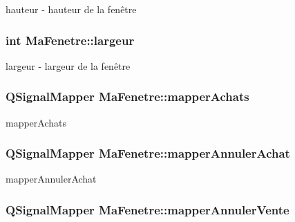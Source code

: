 hauteur -\/ hauteur de la fenêtre 

\hypertarget{class_ma_fenetre_abe37db89fd8895cc34ccc0f5cda67aaf}{
\subsubsection[{largeur}]{\setlength{\rightskip}{0pt plus 5cm}int Ma\-Fenetre\-::largeur\hspace{0.3cm}{\ttfamily [protected]}}}\label{class_ma_fenetre_abe37db89fd8895cc34ccc0f5cda67aaf}


largeur -\/ largeur de la fenêtre 

\hypertarget{class_ma_fenetre_aec38227203ed7fa15ad565077697d661}{
\subsubsection[{mapper\-Achats}]{\setlength{\rightskip}{0pt plus 5cm}Q\-Signal\-Mapper Ma\-Fenetre\-::mapper\-Achats\hspace{0.3cm}{\ttfamily [protected]}}}\label{class_ma_fenetre_aec38227203ed7fa15ad565077697d661}


mapper\-Achats 

\hypertarget{class_ma_fenetre_a08695abd162e35e1cd39132032aef4ca}{
\subsubsection[{mapper\-Annuler\-Achat}]{\setlength{\rightskip}{0pt plus 5cm}Q\-Signal\-Mapper Ma\-Fenetre\-::mapper\-Annuler\-Achat\hspace{0.3cm}{\ttfamily [protected]}}}\label{class_ma_fenetre_a08695abd162e35e1cd39132032aef4ca}


mapper\-Annuler\-Achat 

\hypertarget{class_ma_fenetre_ade92391fa7788e74d4abd7d5755a07d2}{
\subsubsection[{mapper\-Annuler\-Vente}]{\setlength{\rightskip}{0pt plus 5cm}Q\-Signal\-Mapper Ma\-Fenetre\-::mapper\-Annuler\-Vente\hspace{0.3cm}{\ttfamily [protected]}}}\label{class_ma_fenetre_ade92391fa7788e74d4abd7d5755a07d2}


